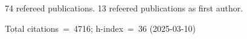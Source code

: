 74 refereed publications. 13 refeered publications as first author.

Total citations~=~4716; h-index~=~36 (2025-03-10)